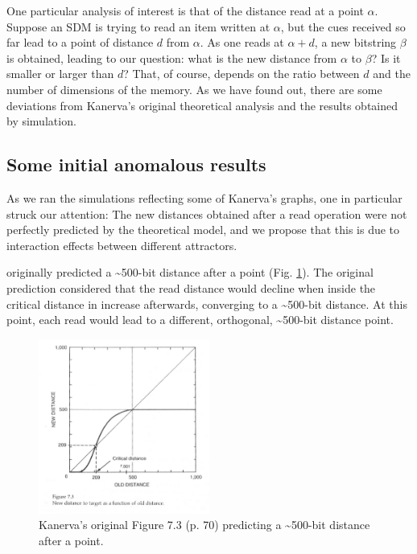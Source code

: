 One particular analysis of interest is that of the distance read at a point $\alpha$. Suppose an SDM is trying to read an item written at $\alpha$, but the cues received so far lead to a point of distance $d$ from $\alpha$.  As one reads at $\alpha+d$, a new bitstring $\beta$ is obtained, leading to our question: what is the new distance from $\alpha$ to $\beta$? Is it smaller or larger than $d$? That, of course, depends on the ratio between $d$ and the number of dimensions of the memory.  As we have found out, there are some deviations from Kanerva's original theoretical analysis and the results obtained by simulation.

\subsection{Some initial anomalous results}

As we ran the simulations reflecting some of Kanerva's graphs, one in particular struck our attention: The new distances obtained after a read operation were not perfectly predicted by the theoretical model, and we propose that this is due to interaction effects between different attractors.

\citet{Kanerva1988} originally predicted a \textasciitilde 500-bit distance after a point (Fig. \ref{kanerva-table-7-2}). The original prediction considered that the read distance would decline when inside the critical distance in increase afterwards, converging to a \textasciitilde 500-bit distance.  At this point, each read would lead to a different, orthogonal, \textasciitilde 500-bit distance point.

\begin{figure}[h]
\centering\includegraphics[width=0.5\textwidth]{images02/kanerva-table-7-2-original.png}
\caption{Kanerva's original Figure 7.3 (p. 70) predicting a \textasciitilde 500-bit distance after a point.
\label{kanerva-table-7-2}}
\end{figure}

